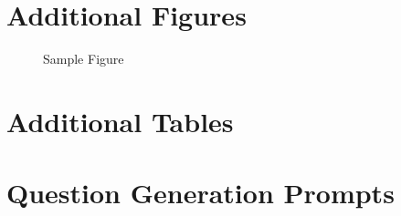 \documentclass[twoside, 11pt]{article}
\begin{document}
\begin{appendices}
    \section{Additional Figures} 
    \begin{figure}[htbp]
      \caption{Sample Figure} 
    \end{figure}

    \vp

    \section{Additional Tables}
    
    

    \vp

    \section{Question Generation Prompts} %
     \vp
     \vp
     \vp
     \vp
     \vp


\end{appendices}
\end{document}
